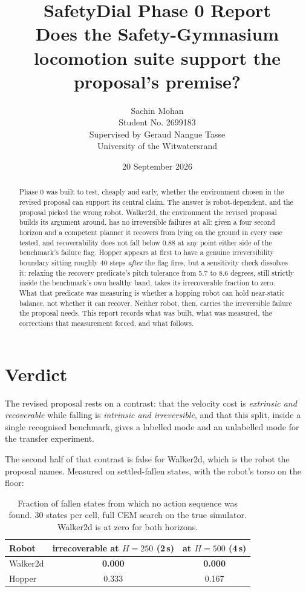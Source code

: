\documentclass[11pt,a4paper]{article}
\title{SafetyDial Phase 0 Report\\[0.4em]
  \large Does the Safety-Gymnasium locomotion suite support the proposal's premise?}
\author{Sachin Mohan \\ Student No. 2699183 \\
  Supervised by Geraud Nangue Tasse \\ University of the Witwatersrand}
\date{20 September 2026}
\begin{document}
\maketitle

\begin{abstract}
Phase 0 was built to test, cheaply and early, whether the environment chosen in the revised
proposal can support its central claim. The answer is robot-dependent, and the proposal picked the
wrong robot. Walker2d, the environment the revised proposal builds its argument around, has no
irreversible failures at all: given a four second horizon and a competent planner it recovers from
lying on the ground in every case tested, and recoverability does not fall below 0.88 at any point
either side of the benchmark's failure flag. Hopper appears at first to have a genuine
irreversibility boundary sitting roughly 40 steps \emph{after} the flag fires, but a sensitivity
check dissolves it: relaxing the recovery predicate's pitch tolerance from 5.7 to 8.6 degrees,
still strictly inside the benchmark's own healthy band, takes its irrecoverable fraction to zero.
What that predicate was measuring is whether a hopping robot can hold near-static balance, not
whether it can recover. Neither robot, then, carries the irreversible failure the proposal needs.
This report records what was built, what was measured, the corrections that measurement forced,
and what follows.
\end{abstract}

\section{Verdict}

The revised proposal rests on a contrast: that the velocity cost is \emph{extrinsic and
recoverable} while falling is \emph{intrinsic and irreversible}, and that this split, inside a
single recognised benchmark, gives a labelled mode and an unlabelled mode for the transfer
experiment.

The second half of that contrast is false for Walker2d, which is the robot the proposal names.
Measured on settled-fallen states, with the robot's torso on the floor:

\begin{table}[H]
\centering
\begin{tabular}{lcc}
\toprule
Robot & irrecoverable at $H=250$ (2\,s) & at $H=500$ (4\,s) \\
\midrule
Walker2d & \textbf{0.000} & \textbf{0.000} \\
Hopper   & 0.333 & 0.167 \\
\bottomrule
\end{tabular}
\caption{Fraction of fallen states from which no action sequence was found. 30 states per cell,
full CEM search on the true simulator. Walker2d is at zero for both horizons.}
\end{table}
\end{document}
